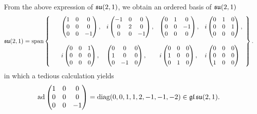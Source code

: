 \documentclass{report}
\begin{document}
From the above expression of $\operatorname{{\mathfrak{su}}}(2,1)$, we obtain an ordered basis of $\operatorname{{\mathfrak{su}}}(2,1)$
\[
    \operatorname{{\mathfrak{su}}}(2,1) = \operatorname{span}\left\{\begin{array}{lllll}
        &\begin{pmatrix}
            1 & 0 & 0\\
            0 & 0 & 0\\
            0 & 0 & -1
        \end{pmatrix},
        &i\begin{pmatrix}
            -1 & 0 & 0\\
            0 & 2 & 0\\
            0 & 0 & -1
        \end{pmatrix},
        &\begin{pmatrix}
            0 & 1 & 0\\
            0 & 0 & -1\\
            0 & 0 & 0
        \end{pmatrix},
        &i\begin{pmatrix}
            0 & 1 & 0\\
            0 & 0 & 1\\
            0 & 0 & 0
        \end{pmatrix},\\~\\
        &i\begin{pmatrix}
            0 & 0 & 1\\
            0 & 0 & 0\\
            0 & 0 & 0
        \end{pmatrix},
        &\begin{pmatrix}
            0 & 0 & 0\\
            1 & 0 & 0\\
            0 & -1 & 0
        \end{pmatrix},
        &i\begin{pmatrix}
            0 & 0 & 0\\
            1 & 0 & 0\\
            0 & 1 & 0
        \end{pmatrix},
        &i\begin{pmatrix}
            0 & 0 & 0\\
            0 & 0 & 0\\
            1 & 0 & 0
        \end{pmatrix}
    \end{array}\right\}.
\]
in which a tedious calculation yields
\[
\operatorname{ad} \begin{pmatrix}
    1 & 0 & 0\\
    0 & 0 & 0\\
    0 & 0 & -1
\end{pmatrix} = \operatorname{diag}(0, 0, 1, 1, 2, -1, -1, -2) \in \operatorname{{\mathfrak{gl}}}{\operatorname{{\mathfrak{su}}}(2,1)}.
\]
\end{document}
